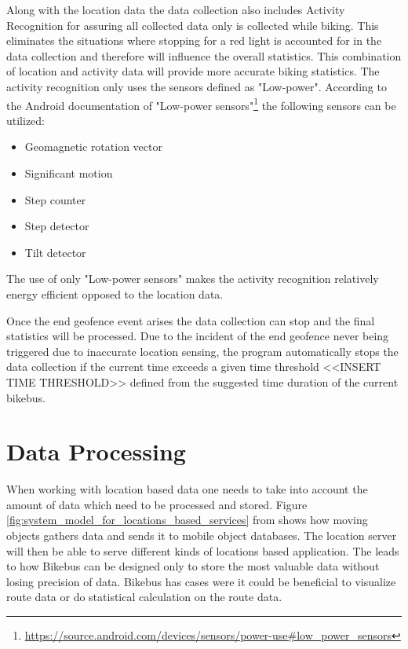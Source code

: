 Along with the location data the data collection also includes Activity Recognition for assuring all collected data only is collected while biking. This eliminates the situations where stopping for a red light is accounted for in the data collection and therefore will influence the overall statistics. This combination of location and activity data will provide more accurate biking statistics. 
The activity recognition only uses the sensors defined as "Low-power".
According to the Android documentation of "Low-power sensors"\footnote{\url{https://source.android.com/devices/sensors/power-use#low_power_sensors}} the following sensors can be utilized:
\begin{itemize}
    \item Geomagnetic rotation vector
    \item Significant motion
    \item Step counter
    \item Step detector
    \item Tilt detector
\end{itemize}
The use of only "Low-power sensors" makes the activity recognition relatively energy efficient opposed to the location data.

Once the end geofence event arises the data collection can stop and the final statistics will be processed. Due to the incident of the end geofence never being triggered due to inaccurate location sensing, the program automatically stops the data collection if the current time exceeds a given time threshold <<INSERT TIME THRESHOLD>> defined from the suggested time duration of the current bikebus.

\section{Data Processing}

When working with location based data one needs to take into account the amount of data which need to be processed and stored. Figure \ref{fig:system_model_for_locations_based_services} from \cite{Lee2011} shows how moving objects gathers data and sends it to mobile object databases. The location server will then be able to serve different kinds of locations based application. The leads to how Bikebus can be designed only to store the most valuable data without losing precision of data. Bikebus has cases were it could be beneficial to visualize route data or do statistical calculation on the route data.   

